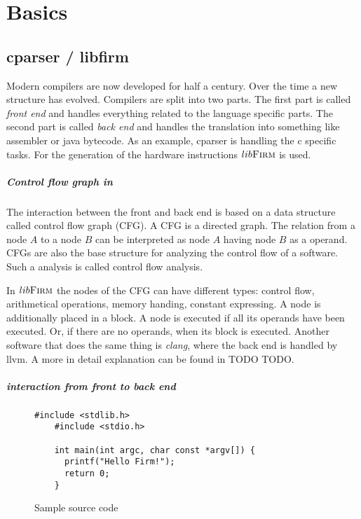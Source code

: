 \chapter{Basics}\label{sec:basics}

\section{cparser / libfirm}
Modern compilers are now developed for half a century. Over the time a new structure has evolved. Compilers are split into two parts. The first part is called \textit{front end} and handles everything related to the language specific parts. The second part is called \textit{back end} and handles the translation into something like assembler or java bytecode. As an example, cparser is handling the c specific tasks. For the generation of the hardware instructions $lib\textsc{Firm}$ is used.

\paragraph{Control flow graph in \libFIRM} The interaction between the front and back end is based on a data structure called control flow graph (CFG). A CFG is a directed graph. The relation from a node $A$ to a node $B$ can be interpreted as node $A$ having node $B$ as a operand.
CFGs are also the base structure for analyzing the control flow of a software. Such a analysis is called control flow analysis.

In $lib\textsc{Firm}$ the nodes of the CFG can have different types: control flow, arithmetical operations, memory handing, constant expressing. A node is additionally placed in a block. A node is executed if all its operands have been executed. Or, if there are no operands, when its block is executed.
Another software that does the same thing is \textit{clang}, where the back end is handled by llvm.
A more in detail explanation can be found in TODO TODO.

\paragraph{interaction from front to back end}

\begin{figure}
	\centering
	\begin{lstlisting}[frame=single]
	#include <stdlib.h>
	#include <stdio.h>
	
	int main(int argc, char const *argv[]) {
	  printf("Hello Firm!");
	  return 0;
	}
	\end{lstlisting} 
	\caption{Sample source code}
	\label{code:workflow:example}
\end{figure}


